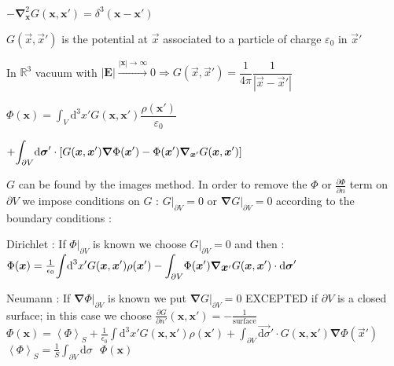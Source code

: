 \columnbreak
{}
\squishlist
\item $-\boldsymbol{\nabla}_{\boldsymbol{x}}^2 G(\boldsymbol{x}, \boldsymbol{x}') = \delta^3(\boldsymbol{x}-\boldsymbol{x}')$

$G(\vec{x},\vec{x}')$ is the potential at $\vec{x}$ associated to a particle of charge $\varepsilon_0$ in $\vec{x}'$
\item In $\mathbb{R}^3$ vacuum with $|\boldsymbol{E}| \overset{|\boldsymbol{x}|\to \infty}{\longrightarrow} 0 \Rightarrow G(\vec{x},\vec{x}') = \dfrac{1}{4\pi}\dfrac{1}{|\vec{x} - \vec{x}'|}$\\ 

\item $\Phi(\boldsymbol{x}) = \displaystyle{\int_V} \text{d}^3 x' G(\boldsymbol{x}, \boldsymbol{x}')\dfrac{\rho(\boldsymbol{x}')}{\varepsilon_0}$ 

$+ \displaystyle{\int_{\partial V}} \boldsymbol{\textrm{d} \sigma}' \cdot \left[G(\boldsymbol{x}, \boldsymbol{x}')\boldsymbol{\nabla}\Phi(\boldsymbol{x}')-\Phi(\boldsymbol{x}')\boldsymbol{\nabla}_{\boldsymbol{x}'}G(\boldsymbol{x}, \boldsymbol{x}')\right]$

$G$ can be found by the images method. In order to remove the $\Phi$ or $\frac{\partial \Phi}{\partial n}$ term on $\partial V$ we impose conditions on $G$ : $G|_{\partial V}=0$ or  $\boldsymbol{\nabla}G|_{\partial V}=0$ according to the boundary conditions :

\item Dirichlet : If $\Phi|_{\partial V}$ is known we choose $G|_{\partial V} =0$ and then :
\\
$\Phi(\boldsymbol{x}) =\frac{1}{\epsilon_0} \displaystyle{\int} \text{d}^3x' G(\boldsymbol{x}, \boldsymbol{x}')\rho(\boldsymbol{x}') - \displaystyle{\int_{\partial V}} \Phi(\mbox{\boldmath$x$}') \mbox{\boldmath$\nabla$}_{\mbox{\boldmath$x$}'} G(\mbox{\boldmath$x$},\mbox{\boldmath$x$}') \cdot \mbox{\boldmath$\textrm{d} \sigma$}'$
\item Neumann : If $\boldsymbol{\nabla}\Phi|_{\partial V}$ is known we put $\boldsymbol{\nabla} G |_{\partial V}=0$ EXCEPTED if $\partial V$ is a closed surface; in this case we choose
$\frac{\partial G}{\partial n'}(\boldsymbol{x}, \boldsymbol{x}')= -\frac{1}{\text{surface}}$
\\
$\Phi(\boldsymbol{x}) = \left\langle \Phi \right\rangle _S + \frac{1}{\epsilon_0}\displaystyle{\int} \text{d}^3x' G(\boldsymbol{x}, \boldsymbol{x}')\rho(\boldsymbol{x}')+\displaystyle{\int_{\partial V}} \vec{\text{d}\sigma}' \cdot G(\boldsymbol{x}, \boldsymbol{x}')\boldsymbol{\nabla}\Phi(\vec{x}')$
\\
$\left\langle \Phi \right\rangle _S = \frac{1}{S}\displaystyle{\int_{\partial V}} \text{d}\sigma \text{ } \Phi(\boldsymbol{x})$

